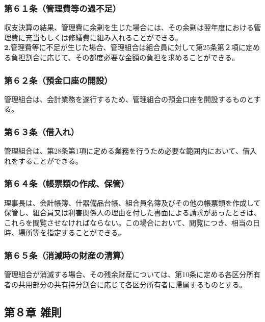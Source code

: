 \documentclass[12pt,uplatex]{jsarticle}
\begin{document}
\subsubsection*{第６１条（管理費等の過不足）}
収支決算の結果、管理費に余剰を生じた場合には、その余剰は翌年度における管理費に充当もしくは修繕費に組み入れることができる。\\
\textbf{2.}管理費等に不足が生じた場合、管理組合は組合員に対して第25条第２項に定める負担割合に応じて、その都度必要な金額の負担を求めることができる。
\subsubsection*{第６２条（預金口座の開設）}
管理組合は、会計業務を遂行するため、管理組合の預金口座を開設するものとする。
\subsubsection*{第６３条（借入れ）}
管理組合は、第28条第1項に定める業務を行うため必要な範囲内において、借入れをすることができる。
\subsubsection*{第６４条（帳票類の作成、保管）}
理事長は、会計帳簿、什器備品台帳、組合員名簿及びその他の帳票類を作成して保管し、組合員又は利害関係人の理由を付した書面による請求があったときは、これらを閲覧させなければならない。この場合において、閲覧につき、相当の日時、場所等を指定することができる。
\subsubsection*{第６５条（消滅時の財産の清算）}
管理組合が消滅する場合、その残余財産については、第10条に定める各区分所有者の共用部分の共有持分割合に応じて各区分所有者に帰属するものとする。

\begin{center}
\subsection*{第８章 雑則}
\end{center}
\end{document}
